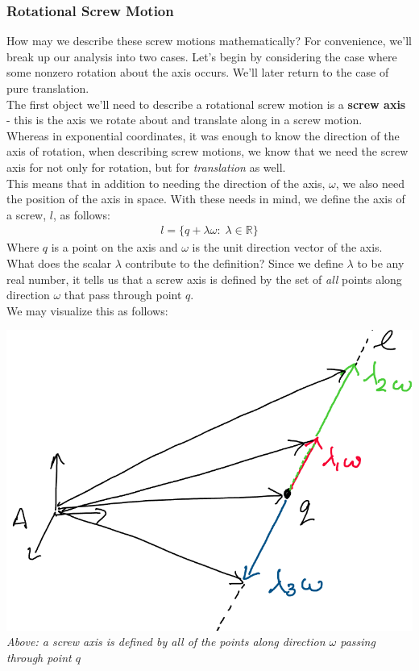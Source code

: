 \documentclass[oneside]{book}
\begin{document}
\subsubsection{Rotational Screw Motion}
How may we describe these screw motions mathematically? For convenience, we'll break up our analysis into two cases. Let's begin by considering the case where some nonzero rotation about the axis occurs. We'll later return to the case of pure translation.\\
The first object we'll need to describe a rotational screw motion is a \textbf{screw axis} - this is the axis we rotate about and translate along in a screw motion.\\
Whereas in exponential coordinates, it was enough to know the direction of the axis of rotation, when describing screw motions, we know that we need the screw axis for not only for rotation, but for \textit{translation} as well.\\
This means that in addition to needing the direction of the axis, $\omega$, we also need the position of the axis in space. With these needs in mind, we define the axis of a screw, $l$, as follows:
\begin{align}
    l = \{q + \lambda \omega: \; \lambda \in \mathbb{R}\}
\end{align}
Where $q$ is a point on the axis and $\omega$ is the unit direction vector of the axis.\\
What does the scalar $\lambda$ contribute to the definition? Since we define $\lambda$ to be any real number, it tells us that a screw axis is defined by the set of \textit{all} points along direction $\omega$ that pass through point $q$.\\
We may visualize this as follows:
\begin{center}
    \includegraphics[scale=0.25]{images/rays.png}\\
    \textit{Above: a screw axis is defined by all of the points along direction $\omega$ passing through point $q$}
\end{center}
\end{document}
